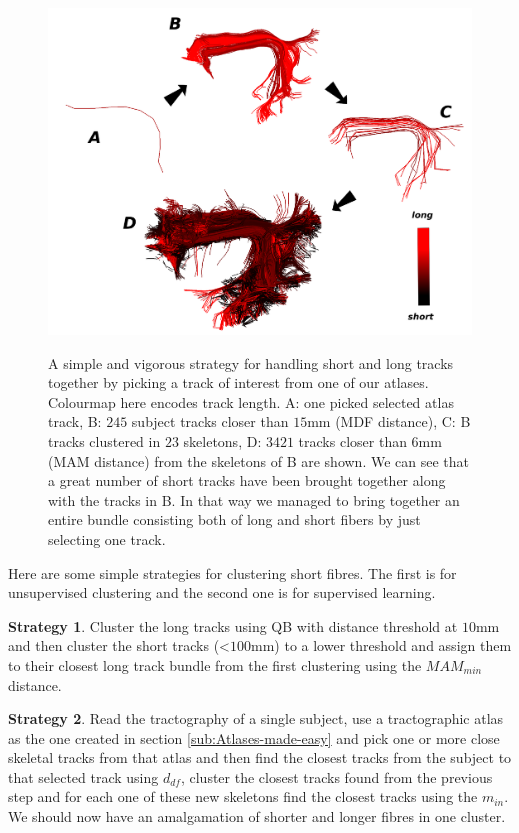 \documentclass[preprint,authoryear,a4paper,10pt,onecolumn]{elsarticle}
\begin{document}
%
\begin{figure}
\begin{centering}
\label{Flo:arcuate_close}\includegraphics[scale=0.7]{last_figures/arcuate_small_fibers}
\par\end{centering}

\caption{A simple and vigorous strategy for handling short and long
  tracks together by picking a track of interest from one of our
  atlases. Colourmap here encodes track length. A: one picked selected
  atlas track, B: $245$ subject tracks closer than $15$mm (MDF
  distance), C: B tracks clustered in $23$ skeletons, D: $3421$ tracks
  closer than $6$mm (MAM distance) from the skeletons of B are shown. We
  can see that a great number of short tracks have been brought together
  along with the tracks in B. In that way we managed to bring together
  an entire bundle consisting both of long and short fibers by just
  selecting one track.}

\end{figure}


Here are some simple strategies for clustering short fibres. The first
is for unsupervised clustering and the second one is for supervised
learning.

\textbf{Strategy 1}. Cluster the long tracks using QB with distance
threshold at $10$mm and then cluster the short tracks (<$100$mm) to a
lower threshold and assign them to their closest long track bundle from
the first clustering using the $MAM_{min}$ distance.

\textbf{Strategy 2}. Read the tractography of a single subject, use a
tractographic atlas as the one created in section
\ref{sub:Atlases-made-easy} and pick one or more close skeletal tracks
from that atlas and then find the closest tracks from the subject to
that selected track using $d_{df}$, cluster the closest tracks found
from the previous step and for each one of these new skeletons find the
closest tracks using the $m_{in}$. We should now have an amalgamation of
shorter and longer fibres in one cluster.
\end{document}
